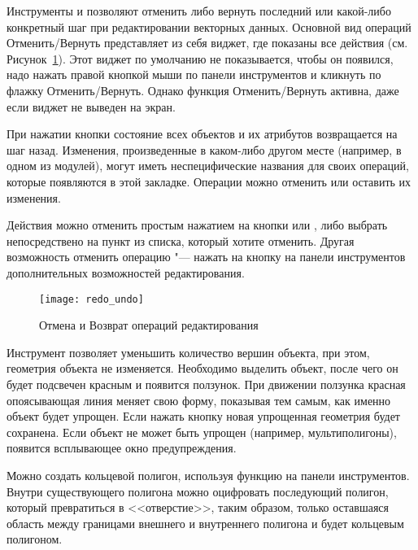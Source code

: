 
Инструменты  и
 позволяют отменить либо вернуть
последний или какой-либо конкретный шаг при редактировании векторных данных.
Основной вид операций Отменить/Вернуть представляет из себя виджет, где
показаны все действия (см. Рисунок~\ref{fig:vector_redoundo}). Этот виджет
по умолчанию не показывается, чтобы он появился, надо нажать правой кнопкой
мыши по панели инструментов и кликнуть по флажку Отменить/Вернуть. Однако
функция Отменить/Вернуть активна, даже если виджет не выведен на экран.

При нажатии кнопки  состояние всех объектов и их атрибутов
возвращается на шаг назад. Изменения, произведенные в каком-либо другом
месте (например, в одном из модулей), могут иметь неспецифические названия
для своих операций, которые появляются в этой закладке. Операции можно
отменить или оставить их изменения.

Действия можно отменить простым нажатием на кнопки  или
, либо выбрать непосредствено на пункт из списка, который
хотите отменить. Другая возможность отменить операцию "--- нажать на кнопку
 на панели инструментов дополнительных возможностей
редактирования.

\begin{figure}[ht]
   \centering
   \texttt{[image: redo\_undo]}
   \caption{Отмена и Возврат операций редактирования \wincaption}\label{fig:vector_redoundo}
\end{figure}


Инструмент  позволяет уменьшить
количество вершин объекта, при этом, геометрия объекта не изменяется.
Необходимо выделить объект, после чего он будет подсвечен красным и появится
ползунок. При движении ползунка красная опоясывающая линия меняет свою форму,
показывая тем самым, как именно объект будет упрощен. Если нажать кнопку 
новая упрощенная геометрия будет сохранена. Если объект не может быть
упрощен (например, мультиполигоны), появится всплывающее окно предупреждения.


Можно создать кольцевой полигон, используя функцию
 на панели инструментов. Внутри
существующего полигона можно оцифровать последующий полигон, который
превратиться в <<отверстие>>, таким образом, только оставшаяся область
между границами внешнего и внутреннего полигона и будет кольцевым полигоном.

